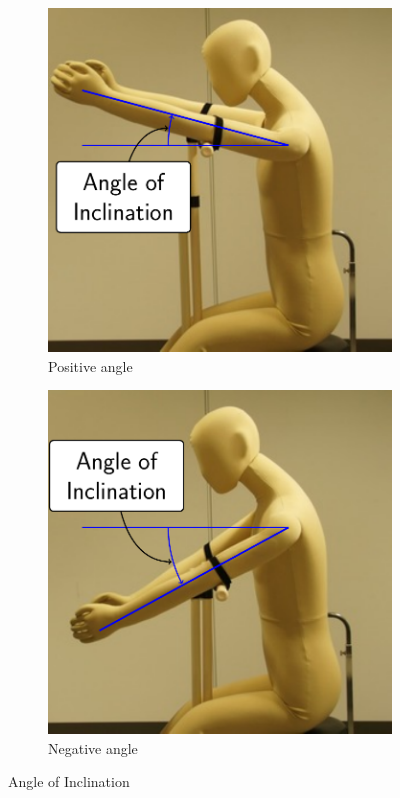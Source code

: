 \documentclass[sigconf]{acmart}
\begin{document}
\begin{figure}
	\centering
	\begin{subfigure}{.5\linewidth}
		\includegraphics[width=.9\linewidth]{inclination_plus}
	    \caption{Positive angle}
	\end{subfigure}%
	\begin{subfigure}{.5\linewidth}
		\includegraphics[width=.9\linewidth]{inclination_minus}
	    \caption{Negative angle}
	\end{subfigure}
	\caption{Angle of Inclination}
	\label{fig:inclination}
\end{figure}
\end{document}
